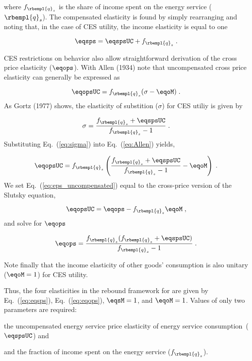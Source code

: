 where $f_{\rbempl{q}_s}$ is the share of income spent 
on the energy service ($\rbempl{q}_s$). The compensated elasticity is found by simply rearranging and noting that, in the case of CES utility, the income elasticity is equal to one 

\begin{equation} \label{eq:eqsps}
  \eqsps = \eqspsUC + f_{\rbempl{q}_s} \;.
\end{equation}

CES restrictions on behavior also allow straightforward derivation of the cross price elasticity ($\eqops$).
With Allen (1934) note that uncompensated cross price elasticity can generally be expressed as

\begin{equation} \label{eq:Allen}
  \eqopsUC = f_{\rbempl{q}_s} ( \sigma - \eqoM) \; .
\end{equation}
%
As Gortz (1977) shows, the elasticity 
of substition ($\sigma$) for CES utiliy is given by

\begin{equation} \label{eq:sigma}
  \sigma  = \frac{f_{\rbempl{q}_s} + \eqspsUC}{f_{\rbempl{q}_s} -1 } \; .
\end{equation}
%
Substituting Eq.~(\ref{eq:sigma}) into Eq.~(\ref{eq:Allen}) yields, 

\begin{equation} \label{eq:eps_uncompensated}
  \eqopsUC = f_{\rbempl{q}_s} \left( \frac{f_{\rbempl{q}_s} + \eqspsUC}{f_{\rbempl{q}_s} -1 } - \eqoM \right) \; .
\end{equation}
%
We set Eq.~(\ref{eq:eps_uncompensated}) equal to 
the cross-price version of the Slutsky equation,

\begin{equation}
  \eqopsUC = \eqops - f_{\rbempl{q}_s} \eqoM \; ,
\end{equation}
%
 and solve for $\eqops$ 

\begin{equation} \label{eq:eqops}
  \eqops = \frac{f_{\rbempl{q}_s} (f_{\rbempl{q}_s} + \eqspsUC)}{f_{\rbempl{q}_s}-1} \; .
\end{equation}

Note finally that the income elasticity of other goods' consumption
is also unitary ($\eqoM = 1$) for CES utility. 


Thus, the four elasticities in the rebound framework for are given by
Eq.~(\ref{eq:eqsps}), 
Eq.~(\ref{eq:eqops}), 
$\eqsM = 1$, and 
$\eqoM = 1$.
Values of only two parameters are required:
%
\begin{enumerate*}[label={(\alph*)}]
	
  \item the uncompensated energy service price elasticity of energy service consumption~($\eqspsUC$) and
  
  \item and the fraction of income spent on the energy service ($f_{\rbempl{q}_s}$).
    
\end{enumerate*}

